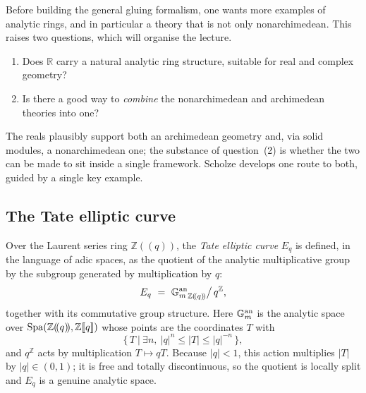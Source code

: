 Before building the general gluing formalism, one wants more examples of
analytic rings, and in particular a theory that is not only nonarchimedean.
This raises two questions, which will organise the lecture.

\begin{remark}
\label{rmk:12:two-questions}
\begin{enumerate}
\item Does $\mathbb{R}$ carry a natural analytic ring structure, suitable for
real and complex geometry?
\item Is there a good way to \emph{combine} the nonarchimedean and archimedean
theories into one?
\end{enumerate}
The reals plausibly support both an archimedean geometry and, via solid modules,
a nonarchimedean one; the substance of question~(2) is whether the two can be
made to sit inside a single framework. Scholze develops one route to both,
guided by a single key example.
\end{remark}

\subsection{The Tate elliptic curve}

\begin{definition}
\label{def:12:tate-curve}
Over the Laurent series ring $\mathbb{Z}(\!(q)\!)$, the \emph{Tate elliptic
curve} $E_q$ is defined, in the language of adic spaces, as the quotient of the
analytic multiplicative group by the subgroup generated by multiplication by
$q$:
\begin{equation*}
E_q\ =\ {\Gm^{\mathrm{an}}}_{\mathbb{Z}(\!(q)\!)}\big/\,q^{\mathbb{Z}},
\end{equation*}
together with its commutative group structure. Here $\mathbb{G}_{m}^{\mathrm{an}}$ is the
analytic space over $\operatorname{Spa}(\mathbb{Z}(\!(q)\!),\mathbb{Z}[\![q]\!])$ whose points
are the coordinates $T$ with
\begin{equation*}
\bigl\{\,T\ \big|\ \exists n,\ |q|^{n}\le |T|\le |q|^{-n}\,\bigr\},
\end{equation*}
and $q^{\mathbb{Z}}$ acts by multiplication $T\mapsto qT$. Because $|q|<1$, this
action multiplies $|T|$ by $|q|\in(0,1)$; it is free and totally discontinuous,
so the quotient is locally split and $E_q$ is a genuine analytic space.
\end{definition}

